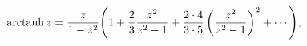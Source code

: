 \[\mathop{\mathrm{arctanh}\/}\nolimits z=\frac{z}{1-z^{2}}\*{\left(1+\frac{2}{3}%
\frac{z^{2}}{z^{2}-1}+\frac{2\cdot 4}{3\cdot 5}\left(\frac{z^{2}}{z^{2}-1}%
\right)^{2}+\cdots\right)},\]